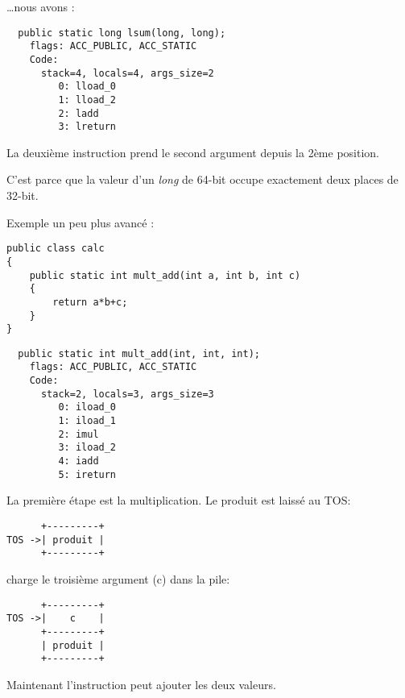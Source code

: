 \dots nous avons :

\begin{lstlisting}
  public static long lsum(long, long);
    flags: ACC_PUBLIC, ACC_STATIC
    Code:
      stack=4, locals=4, args_size=2
         0: lload_0       
         1: lload_2       
         2: ladd          
         3: lreturn       
\end{lstlisting}

La deuxième instruction  prend le second argument depuis la 2ème position.

C'est parce que la valeur d'un \emph{long} de 64-bit occupe exactement deux places de 32-bit.


Exemple un peu plus avancé :


\begin{lstlisting}[style=customjava]
public class calc
{
	public static int mult_add(int a, int b, int c)
	{
		return a*b+c;
	}
}
\end{lstlisting}

\begin{lstlisting}
  public static int mult_add(int, int, int);
    flags: ACC_PUBLIC, ACC_STATIC
    Code:
      stack=2, locals=3, args_size=3
         0: iload_0       
         1: iload_1       
         2: imul          
         3: iload_2       
         4: iadd          
         5: ireturn       
\end{lstlisting}

La première étape est la multiplication. Le produit est laissé au \ac{TOS}:


\begin{lstlisting}
      +---------+
TOS ->| produit |
      +---------+
\end{lstlisting}

 charge le troisième argument (c) dans la pile:

\begin{lstlisting}
      +---------+
TOS ->|    c    |
      +---------+
      | produit |
      +---------+
\end{lstlisting}

Maintenant l'instruction  peut ajouter les deux valeurs.

